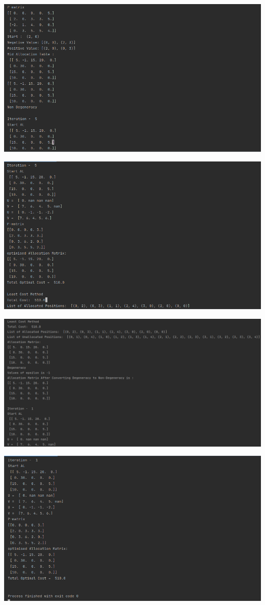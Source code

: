 \documentclass[12pt, letterpaper, twoside]{book}
\begin{document}
\includegraphics[width=550pt]{Output7}

\includegraphics[width=550pt]{Output8}

\includegraphics[width=550pt]{Output9}

\includegraphics[width=550pt]{Output10}

\pagebreak
\end{document}

